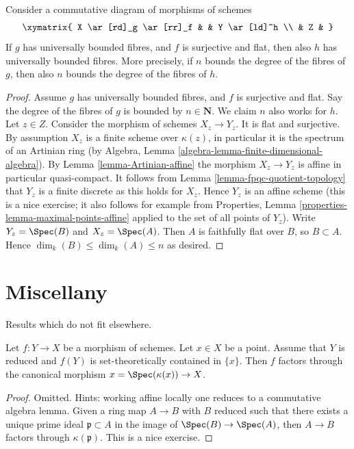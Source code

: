 \begin{lemma}
\label{lemma-universally-bounded-permanence}
Consider a commutative diagram of morphisms of schemes
$$
\xymatrix{
X \ar[rd]_g \ar[rr]_f & & Y \ar[ld]^h \\
& Z &
}
$$
If $g$ has universally bounded fibres, and $f$ is surjective and flat,
then also $h$ has universally bounded fibres. More precisely, if $n$
bounds the degree of the fibres of $g$, then also $n$ bounds the
degree of the fibres of $h$.
\end{lemma}

\begin{proof}
Assume $g$ has universally bounded fibres, and $f$ is surjective and flat.
Say the degree of the fibres of $g$ is bounded by $n \in \mathbf{N}$.
We claim $n$ also works for $h$.
Let $z \in Z$. Consider the morphism of schemes $X_z \to Y_z$.
It is flat and surjective. By assumption $X_z$ is a finite scheme
over $\kappa(z)$, in particular it is the spectrum of an
Artinian ring (by
Algebra, Lemma \ref{algebra-lemma-finite-dimensional-algebra}).
By Lemma \ref{lemma-Artinian-affine} the morphism $X_z \to Y_z$ is affine
in particular quasi-compact. It follows from
Lemma \ref{lemma-fpqc-quotient-topology}
that $Y_z$ is a finite discrete as this holds for $X_z$.
Hence $Y_z$ is an affine scheme (this is a nice exercise; it also follows
for example from
Properties, Lemma \ref{properties-lemma-maximal-points-affine}
applied to the set of all points of $Y_z$).
Write $Y_z = \Spec(B)$ and $X_z = \Spec(A)$.
Then $A$ is faithfully flat over $B$, so $B \subset A$.
Hence $\dim_k(B) \leq \dim_k(A) \leq n$ as desired.
\end{proof}





\section{Miscellany}
\label{section-misc}

\noindent
Results which do not fit elsewhere.

\begin{lemma}
\label{lemma-factor-through-point}
Let $f : Y \to X$ be a morphism of schemes. Let $x \in X$ be a point.
Assume that $Y$ is reduced and $f(Y)$ is set-theoretically contained
in $\{x\}$. Then $f$ factors through the canonical morphism
$x = \Spec(\kappa(x)) \to X$.
\end{lemma}

\begin{proof}
Omitted. Hints: working affine locally one reduces to a commutative algebra
lemma. Given a ring map $A \to B$ with $B$ reduced such that there exists
a unique prime ideal $\mathfrak p \subset A$ in the image of
$\Spec(B) \to \Spec(A)$, then $A \to B$ factors through $\kappa(\mathfrak p)$.
This is a nice exercise.
\end{proof}

